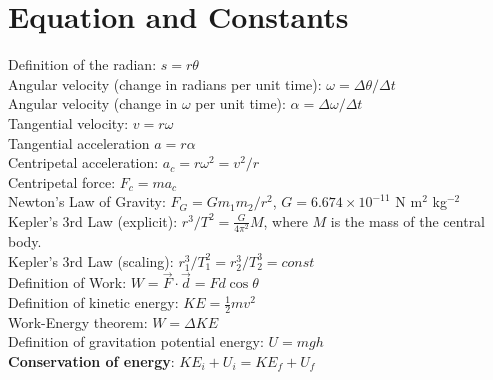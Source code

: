 \documentclass[10pt]{article}
\begin{document}
\maketitle
\small
\section{Equation and Constants}
Definition of the radian: $s = r \theta$ \\
Angular velocity (change in radians per unit time): $\omega = \Delta \theta/\Delta t$ \\
Angular velocity (change in $\omega$ per unit time): $\alpha = \Delta \omega/\Delta t$ \\
Tangential velocity: $v = r\omega$ \\
Tangential acceleration $a = r\alpha$ \\
Centripetal acceleration: $a_c = r\omega^2 = v^2/r$ \\
Centripetal force: $F_c = m a_c$ \\
Newton's Law of Gravity: $F_G = G m_1 m_2 / r^2$, $G = 6.674\times 10^{-11}$ N m$^2$ kg$^{-2}$ \\
Kepler's 3rd Law (explicit): $r^3/T^2 = \frac{G}{4\pi^2} M$, where $M$ is the mass of the central body. \\
Kepler's 3rd Law (scaling): $r_1^3/T_1^2 = r_2^3/T_2^3 = const$ \\
Definition of Work: $W = \vec{F} \cdot \vec{d} = Fd\cos\theta$ \\
Definition of kinetic energy: $KE = \frac{1}{2} mv^2$ \\
Work-Energy theorem: $W = \Delta KE$ \\
Definition of gravitation potential energy: $U = mgh$ \\
\textbf{Conservation of energy}: $KE_i + U_i = KE_f + U_f$
\end{document}
